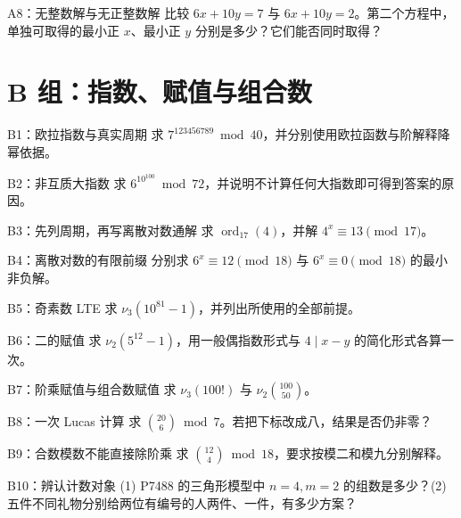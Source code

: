 \documentclass[UTF8,a4paper,11pt,oneside,openany,fontset=fandol]{ctexbook}
\theoremstyle{definition}
\newcommand{\ord}{\operatorname{ord}}
\begin{document}
\begin{problem}{A8：无整数解与无正整数解}
比较 $6x+10y=7$ 与 $6x+10y=2$。第二个方程中，单独可取得的最小正 $x$、最小正 $y$ 分别是多少？它们能否同时取得？
\end{problem}


\section{B 组：指数、赋值与组合数}
\begin{problem}{B1：欧拉指数与真实周期}
求 $7^{123456789}\bmod40$，并分别使用欧拉函数与阶解释降幂依据。
\end{problem}


\begin{problem}{B2：非互质大指数}
求 $6^{10^{100}}\bmod72$，并说明不计算任何大指数即可得到答案的原因。
\end{problem}


\begin{problem}{B3：先列周期，再写离散对数通解}
求 $\ord_{17}(4)$，并解 $4^x\equiv13\pmod{17}$。
\end{problem}


\begin{problem}{B4：离散对数的有限前缀}
分别求 $6^x\equiv12\pmod{18}$ 与 $6^x\equiv0\pmod{18}$ 的最小非负解。
\end{problem}


\begin{problem}{B5：奇素数 LTE}
求 $\nu_3(10^{81}-1)$，并列出所使用的全部前提。
\end{problem}


\begin{problem}{B6：二的赋值}
求 $\nu_2(5^{12}-1)$，用一般偶指数形式与 $4\mid x-y$ 的简化形式各算一次。
\end{problem}


\begin{problem}{B7：阶乘赋值与组合数赋值}
求 $\nu_3(100!)$ 与 $\nu_2\binom{100}{50}$。
\end{problem}


\begin{problem}{B8：一次 Lucas 计算}
求 $\binom{20}{6}\bmod7$。若把下标改成八，结果是否仍非零？
\end{problem}


\begin{problem}{B9：合数模数不能直接除阶乘}
求 $\binom{12}{4}\bmod18$，要求按模二和模九分别解释。
\end{problem}


\begin{problem}{B10：辨认计数对象}
(1) P7488 的三角形模型中 $n=4,m=2$ 的组数是多少？(2) 五件不同礼物分别给两位有编号的人两件、一件，有多少方案？
\end{problem}
\end{document}
